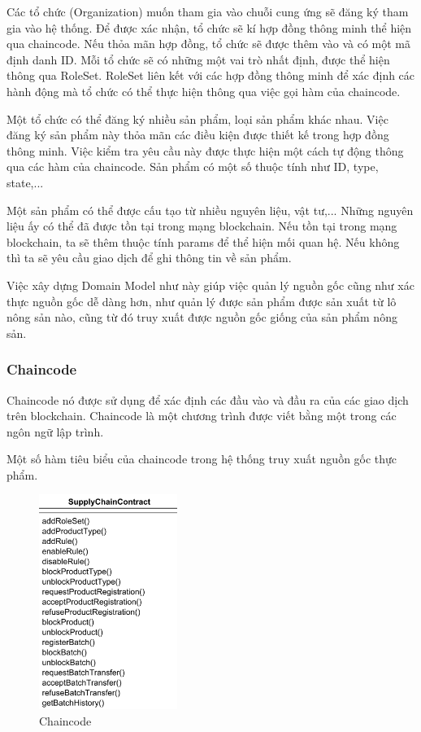 Các tổ chức (Organization) muốn tham gia vào chuỗi cung ứng sẽ đăng ký tham gia vào hệ thống. Để được xác nhận, 
tổ chức sẽ kí hợp đồng thông minh thể hiện qua chaincode. Nếu thỏa mãn hợp đồng, 
tổ chức sẽ được thêm vào và có một mã định danh ID. Mỗi tổ chức sẽ có những một vai trò nhất định, được thể hiện
thông qua RoleSet. RoleSet liên kết với các hợp đồng thông minh để xác định các hành động mà
tổ chức có thể thực hiện thông qua việc gọi hàm của chaincode.

Một tổ chức có thể đăng ký nhiều sản phẩm, loại sản phẩm khác nhau. Việc đăng ký sản phẩm
này thỏa mãn các điều kiện được thiết kế trong hợp đồng thông minh. Việc kiểm tra 
yêu cầu này được thực hiện một cách tự động thông qua các hàm của chaincode. Sản phẩm có một 
số thuộc tính như ID, type, state,...

Một sản phẩm có thể được cấu tạo từ nhiều nguyên liệu, vật tư,... Những nguyên liệu ấy
có thể đã được tồn tại trong mạng blockchain. Nếu tồn tại trong mạng blockchain, ta sẽ thêm 
thuộc tính params để thể hiện mối quan hệ. Nếu không thì ta sẽ yêu cầu giao dịch
để ghi thông tin về sản phẩm\cite{app}. 

Việc xây dựng Domain Model như này giúp việc quản lý nguồn gốc cũng như xác thực nguồn gốc 
dễ dàng hơn, như quản lý được sản phẩm được sản xuất từ lô nông sản nào, cũng từ đó truy xuất được nguồn gốc giống của sản phẩm nông sản.
\subsubsection{Chaincode}
Chaincode nó được sử dụng để xác định các đầu vào và đầu ra của các giao dịch trên blockchain. Chaincode là một chương trình được 
viết bằng một trong các ngôn ngữ lập trình.

Một số hàm tiêu biểu của chaincode trong hệ thống truy xuất nguồn gốc thực phẩm.

\begin{figure}[h]
    \centering
    \includegraphics[width=0.4\textwidth]{images/Smart_Contract.png}
    \caption{Chaincode }
\end{figure}

